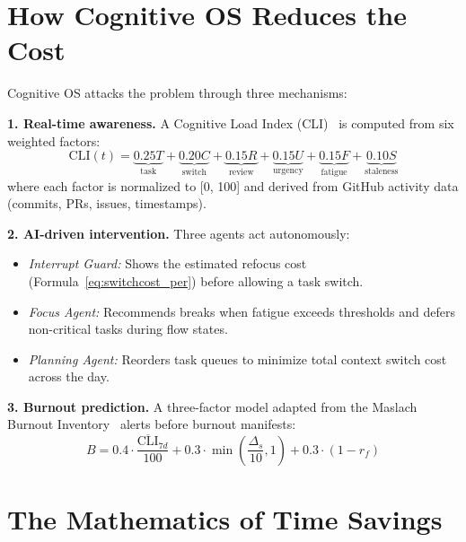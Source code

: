 \documentclass[11pt, twocolumn]{article}
\begin{document}
\section{How Cognitive OS Reduces the Cost}

Cognitive OS attacks the problem through three mechanisms:

\textbf{1. Real-time awareness.} A Cognitive Load Index (CLI)~\cite{sweller1988cognitive, hart1988development} is computed from six weighted factors:
\begin{equation}
\text{CLI}(t) = \underbrace{0.25 T}_{\text{task}} + \underbrace{0.20 C}_{\text{switch}} + \underbrace{0.15 R}_{\text{review}} + \underbrace{0.15 U}_{\text{urgency}} + \underbrace{0.15 F}_{\text{fatigue}} + \underbrace{0.10 S}_{\text{staleness}}
\label{eq:cli}
\end{equation}
where each factor is normalized to [0, 100] and derived from GitHub activity data (commits, PRs, issues, timestamps).

\textbf{2. AI-driven intervention.} Three agents act autonomously:
\begin{itemize}[noitemsep, topsep=2pt]
    \item \emph{Interrupt Guard:} Shows the estimated refocus cost (Formula~\ref{eq:switchcost_per}) before allowing a task switch.
    \item \emph{Focus Agent:} Recommends breaks when fatigue exceeds thresholds and defers non-critical tasks during flow states.
    \item \emph{Planning Agent:} Reorders task queues to minimize total context switch cost across the day.
\end{itemize}

\textbf{3. Burnout prediction.} A three-factor model adapted from the Maslach Burnout Inventory~\cite{maslach1996maslach} alerts before burnout manifests:
\begin{equation}
B = 0.4 \cdot \frac{\overline{\text{CLI}}_{7d}}{100} + 0.3 \cdot \min\!\left(\frac{\Delta_s}{10}, 1\right) + 0.3 \cdot (1 - r_f)
\label{eq:burnout}
\end{equation}

\section{The Mathematics of Time Savings}
\end{document}
